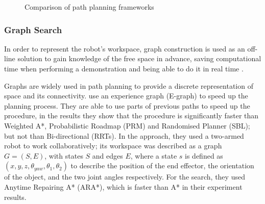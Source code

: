 \documentclass[thesis]{mas_proposal}
\begin{document}
    \begin{figure}[h]
    	\centering
    	\label{fig:related_frameworks}
    	\caption{Comparison of path planning frameworks}
    \end{figure}   
    
    \subsubsection{Graph Search}
    
    In order to represent the robot's workspace, graph construction is used as an off-line solution to gain knowledge of the free space in advance, saving computational time when performing a demonstration and being able to do it in real time \cite{Siegwart2011}. 
    
    Graphs are widely used in path planning to provide a discrete representation of space and its connectivity. \cite{Phillips2012} use an experience graph (E-graph) to speed up the planning process. They are able to use parts of previous paths to speed up the procedure, in the results they show that the procedure is significantly faster than Weighted A*, Probabilistic Roadmap (PRM) and Randomised Planner (SBL); but not than Bi-directional (RRTs). In the \cite{Cohen2012} approach, they used a two-armed robot to work collaboratively; its workspace was described as a graph $G = (S, E)$, with states $S$ and edges $E$, where a state $s$ is defined as $(x, y, z, \theta_{yaw}, \theta_{1}, \theta_{2})$ to describe the position of the end effector, the orientation of the object, and the two joint angles respectively. For the search, they used Anytime Repairing A* (ARA*), which is faster than A* in their experiment results.
    
\end{document}
